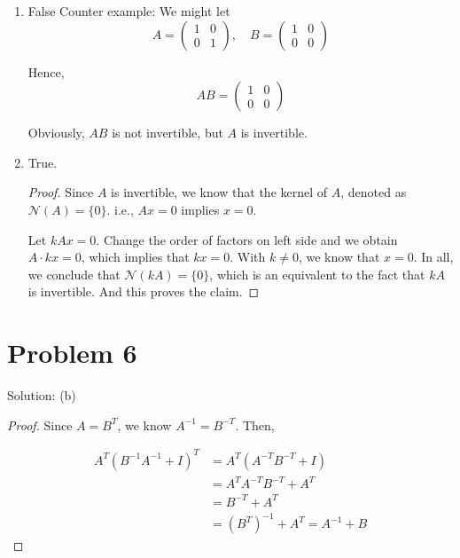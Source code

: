\documentclass[12pt]{article}
\begin{document}
\begin{enumerate}
\begin{enumerate}
\item Method 2

\begin{proof}

Since $AB$ is invertible, we know $det(AB) \neq 0$. With $det(AB) = det(A)\cdot det(B)$, it implies $det(A)\cdot det(B) \neq 0$, which means both $det(A) \neq 0$ and $det(B) \neq 0$. This proves that both $A$ and $B$ are invertible.

\end{proof}



\end{enumerate}


\item False
Counter example:
We might let
$$
A = \begin{pmatrix}
1 & 0 \\
0 & 1
\end{pmatrix}, \quad
B = \begin{pmatrix}
1 & 0 \\
0 & 0
\end{pmatrix}
$$

Hence, $$AB = \begin{pmatrix}
1 & 0 \\
0 & 0
\end{pmatrix}
$$

Obviously, $AB$ is not invertible, but $A$ is invertible.



\item True.

\begin{proof}
Since $A$ is invertible, we know that the kernel of $A$, denoted as $\mathcal N(A) = \{0\}$. i.e., $Ax = 0$ implies $x = 0$. 

Let $kAx = 0$. Change the order of factors on left side and we obtain $A\cdot kx = 0$, which implies that $kx = 0$. With $k\neq 0$, we know that $x = 0$. In all, we conclude that $\mathcal N(kA) = \{0\}$, which is an equivalent to the fact that $kA$ is invertible. And this proves the claim.

\end{proof}
\end{enumerate}


\section{Problem 6}
Solution: (b)

\begin{proof}
Since $A = B^T$, we know $A^{-1} = B^{-T}$. Then, 

$$
\begin{aligned}
A^T(B^{-1}A^{-1} + I)^T 
& = A^T(A^{-T}B^{-T} + I) \\
& = A^TA^{-T}B^{-T} + A^T \\
& = B^{-T} + A^T \\
& = (B^T)^{-1} + A^T = A^{-1} + B
\end{aligned}
$$

\end{proof}
\end{document}
